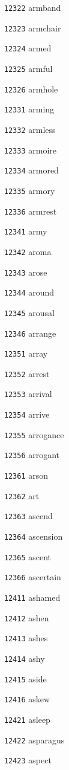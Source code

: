 \documentclass[twoside,11pt]{article}
\begin{document}
\begin{multicols}{5}
\begin{enumerate}
\item[\texttt{12322}] armband
\item[\texttt{12323}] armchair
\item[\texttt{12324}] armed
\item[\texttt{12325}] armful
\item[\texttt{12326}] armhole
\item[\texttt{12331}] arming
\item[\texttt{12332}] armless
\item[\texttt{12333}] armoire
\item[\texttt{12334}] armored
\item[\texttt{12335}] armory
\item[\texttt{12336}] armrest
\item[\texttt{12341}] army
\item[\texttt{12342}] aroma
\item[\texttt{12343}] arose
\item[\texttt{12344}] around
\item[\texttt{12345}] arousal
\item[\texttt{12346}] arrange
\item[\texttt{12351}] array
\item[\texttt{12352}] arrest
\item[\texttt{12353}] arrival
\item[\texttt{12354}] arrive
\item[\texttt{12355}] arrogance
\item[\texttt{12356}] arrogant
\item[\texttt{12361}] arson
\item[\texttt{12362}] art
\item[\texttt{12363}] ascend
\item[\texttt{12364}] ascension
\item[\texttt{12365}] ascent
\item[\texttt{12366}] ascertain
\item[\texttt{12411}] ashamed
\item[\texttt{12412}] ashen
\item[\texttt{12413}] ashes
\item[\texttt{12414}] ashy
\item[\texttt{12415}] aside
\item[\texttt{12416}] askew
\item[\texttt{12421}] asleep
\item[\texttt{12422}] asparagus
\item[\texttt{12423}] aspect

\end{enumerate}
\end{multicols}
\end{document}

